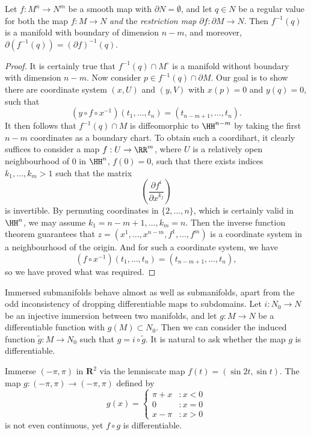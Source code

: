 \begin{theorem}
    Let $f: M^n \to N^m$ be a smooth map with $\partial N = \emptyset$, and let $q \in N$ be a regular value for both the map $f: M \to N$ \emph{and} the \emph{restriction map} $\partial f: \partial M \to N$. Then $f^{-1}(q)$ is a manifold with boundary of dimension $n-m$, and moreover, $\partial(f^{-1}(q)) = (\partial f)^{-1}(q)$.
\end{theorem}
\begin{proof}
    It is certainly true that $f^{-1}(q) \cap M^\circ$ is a manifold without boundary with dimension $n-m$. Now consider $p \in f^{-1}(q) \cap \partial M$. Our goal is to show there are coordinate system $(x,U)$ and $(y,V)$ with $x(p) = 0$ and $y(q) = 0$, such that
    \[ (y \circ f \circ x^{-1})(t_1, \dots, t_n) = (t_{n-m+1}, \dots, t_n). \]
    It then follows that $f^{-1}(q) \cap M$ is diffeomorphic to $\HH^{n-m}$ by taking the first $n-m$ coordinates as a boundary chart. To obtain such a coordihart, it clearly suffices to consider a map $f: U \to \RR^m$, where $U$ is a relatively open neighbourhood of $0$ in $\HH^n$, $f(0) = 0$, such that there exists indices $k_1, \dots, k_m > 1$ such that the matrix
    \[ \left( \frac{\partial f^i}{\partial x^{k_j}} \right) \]
    is invertible. By permuting coordinates in $\{ 2, \dots, n \}$, which is certainly valid in $\HH^n$, we may assume $k_1 = n-m+1, \dots, k_m = n$. Then the inverse function theorem guarantees that $z = (x^1, \dots, x^{n-m}, f^1, \dots, f^m)$ is a coordinate system in a neighbourhood of the origin. And for such a coordinate system, we have
    \[ (f \circ x^{-1})(t_1, \dots, t_n) = (t_{n-m+1}, \dots, t_n), \]
    so we have proved what was required.
\end{proof}

Immersed submanifolds behave almost as well as submanifolds, apart from the odd inconsistency of dropping differentiable maps to subdomains. Let $i: N_0 \to N$ be an injective immersion between two manifolds, and let $g: M \to N$ be a differentiable function with $g(M) \subset N_0$. Then we can consider the induced function $\tilde{g}: M \to N_0$ such that $g = i \circ \tilde{g}$. It is natural to ask whether the map $g$ is differentiable.

\begin{example}
    Immerse $(-\pi, \pi)$ in $\mathbf{R}^2$ via the lemniscate map $f(t) = (\sin 2t, \sin t)$. The map $g:(-\pi, \pi) \to (-\pi, \pi)$ defined by
    \[ g(x) = \begin{cases} \pi + x &: x < 0 \\ 0 &: x = 0 \\ x - \pi &: x > 0 \end{cases} \]
    is not even continuous, yet $f \circ g$ is differentiable.
\end{example}

